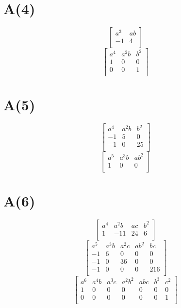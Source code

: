 \documentclass[10pt]{amsart}
\begin{document}
\setcounter{MaxMatrixCols}{70}
\section*{A(4)}
\[ \begin{bmatrix}
a^{3} & ab \\
-1 & 4 \\
\end{bmatrix} \]
\[ \begin{bmatrix}
a^{4} & a^{2}b & b^{2} \\
1 & 0 & 0 \\
0 & 0 & 1 \\
\end{bmatrix} \]
\section*{A(5)}
\[ \begin{bmatrix}
a^{4} & a^{2}b & b^{2} \\
-1 & 5 & 0 \\
-1 & 0 & 25 \\
\end{bmatrix} \]
\[ \begin{bmatrix}
a^{5} & a^{3}b & ab^{2} \\
1 & 0 & 0 \\
\end{bmatrix} \]
\section*{A(6)}
\[ \begin{bmatrix}
a^{4} & a^{2}b & ac & b^{2} \\
1 & -11 & 24 & 6 \\
\end{bmatrix} \]
\[ \begin{bmatrix}
a^{5} & a^{3}b & a^{2}c & ab^{2} & bc \\
-1 & 6 & 0 & 0 & 0 \\
-1 & 0 & 36 & 0 & 0 \\
-1 & 0 & 0 & 0 & 216 \\
\end{bmatrix} \]
\[ \begin{bmatrix}
a^{6} & a^{4}b & a^{3}c & a^{2}b^{2} & abc & b^{3} & c^{2} \\
1 & 0 & 0 & 0 & 0 & 0 & 0 \\
0 & 0 & 0 & 0 & 0 & 0 & 1 \\
\end{bmatrix} \]
\end{document}
